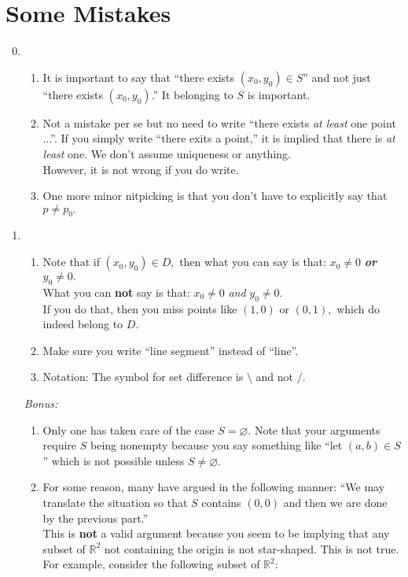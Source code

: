 \documentclass{article}
\let\emptyset\varnothing
\begin{document}
\section{Some Mistakes}
\begin{enumerate}[label = Q.\arabic*.] 
	\setcounter{enumi}{-1}
	\item 
	\begin{enumerate} 
		\item It is important to say that ``there exists $(x_0, y_0) \in S$'' and not just ``there exists $(x_0, y_0)$.'' It belonging to $S$ is important.
		\item Not a mistake per se but no need to write ``there exists \emph{at least} one point ...''. If you simply write ``there exits a point,'' it is implied that there is \emph{at least} one. We don't assume uniqueness or anything.\\
		However, it is not wrong if you do write.
		\item One more minor nitpicking is that you don't have to explicitly say that $p \neq p_0.$
	\end{enumerate}
	\item 
	\begin{enumerate} 
		\item Note that if $(x_0, y_0) \in D,$ then what you can say is that: $x_0 \neq 0$ \emph{\textbf{or}} $y_0 \neq 0.$\\
		What you can \textbf{not} say is that: $x_0 \neq 0$ \emph{and} $y_0 \neq 0.$\\
		If you do that, then you miss points like $(1, 0)$ or $(0, 1),$ which do indeed belong to $D.$
		\item Make sure you write ``line segment'' instead of ``line''.
		\item Notation: The symbol for set difference is $\setminus$ and not $/.$
	\end{enumerate}
	\emph{Bonus:}
	\begin{enumerate}
		\item Only one has taken care of the case $S = \emptyset.$ Note that your arguments require $S$ being nonempty because you say something like ``let $(a, b) \in S$'' which is not possible unless $S \neq \emptyset.$
		\item For some reason, many have argued in the following manner: ``We may translate the situation so that $S$ contains $(0, 0)$ and then we are done by the previous part.''\\
		This is \textbf{not} a valid argument because you seem to be implying that any subset of $\mathbb{R}^2$ not containing the origin is not star-shaped. This is not true. For example, consider the following subset of $\mathbb{R}^2:$

\end{enumerate}
\end{enumerate}
\end{document}

